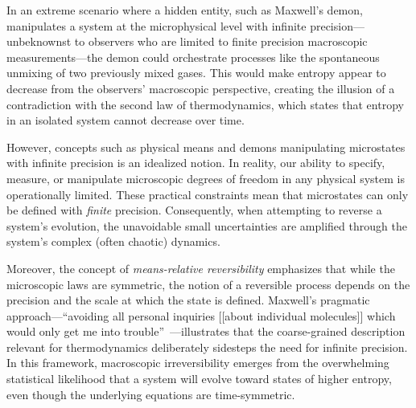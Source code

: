 \documentclass[shortAfour,sageh,times]{sagej}
\begin{document}
In an extreme scenario where a hidden entity, such as Maxwell's demon, manipulates a system at the microphysical level with infinite precision---unbeknownst
to observers who are limited to finite precision macroscopic measurements---the demon could orchestrate processes like the spontaneous unmixing of two previously mixed gases.
This would make entropy appear to decrease from the observers' macroscopic perspective, creating the illusion of a contradiction with the second law of thermodynamics,
which states that entropy in an isolated system cannot decrease over time.

However, concepts such as physical means and demons manipulating microstates with infinite precision is an idealized notion.
In reality, our ability to specify, measure, or manipulate microscopic degrees of freedom in any physical system is operationally limited.
These practical constraints mean that microstates can only be defined with \emph{finite} precision.
Consequently, when attempting to reverse a system's evolution, the unavoidable small uncertainties are amplified through the system's complex (often chaotic) dynamics.

Moreover, the concept of \emph{means-relative reversibility}  emphasizes that while the microscopic laws are symmetric, the notion of a reversible process depends on the precision and the scale at which the state is defined.
Maxwell's pragmatic approach---``avoiding all personal inquiries [[about individual molecules]] which would only get me into trouble''~\citep{Maxwell-1879,garber}---illustrates
that the coarse-grained description relevant for thermodynamics deliberately sidesteps the need for infinite precision. In this framework, macroscopic irreversibility emerges from the overwhelming statistical likelihood that a system will evolve toward states of higher entropy,
even though the underlying equations are time-symmetric.

\end{document}
